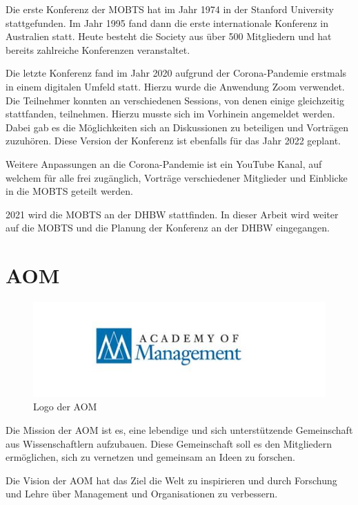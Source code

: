Die erste Konferenz der \ac{MOBTS} hat im Jahr 1974 in der Stanford University stattgefunden. Im Jahr 1995 fand dann die erste internationale Konferenz in Australien statt. \autocite[Vgl.][]{MOBTS.432021c} Heute besteht die Society aus über 500 Mitgliedern und hat bereits zahlreiche Konferenzen veranstaltet. \autocite[Vgl. Minute 13][]{MOBTS.432021b}

Die letzte Konferenz fand im Jahr 2020 aufgrund der Corona-Pandemie erstmals in einem digitalen Umfeld statt. Hierzu wurde die Anwendung Zoom verwendet. Die Teilnehmer konnten an verschiedenen Sessions, von denen einige gleichzeitig stattfanden, teilnehmen. Hierzu musste sich im Vorhinein angemeldet werden. \autocite[Vgl.][]{MOBTS.432021d}  Dabei gab es die Möglichkeiten sich an Diskussionen zu beteiligen und Vorträgen zuzuhören. Diese Version der Konferenz ist ebenfalls für das Jahr 2022 geplant. 

Weitere Anpassungen an die Corona-Pandemie ist ein YouTube Kanal, auf welchem für alle frei zugänglich, Vorträge verschiedener Mitglieder und Einblicke in die \ac{MOBTS} geteilt werden. \autocite[Vgl.][]{MOBTS.432021} 

2021 wird die \ac{MOBTS} an der DHBW stattfinden. In dieser Arbeit wird weiter auf die \ac{MOBTS} und die Planung der Konferenz an der DHBW eingegangen.

\section{\ac{AOM}}
\begin{figure}[h]
    \centering
    \includegraphics[width=1\textwidth]{img/th.jpg}
    \caption[Logo: AOM]{Logo der \ac{AOM}}
    \label{fig:LOGO AOM}
\end{figure}
Die Mission der \ac{AOM} ist es, eine lebendige und sich unterstützende Gemeinschaft aus Wissenschaftlern aufzubauen. Diese Gemeinschaft soll es den Mitgliedern ermöglichen, sich zu vernetzen und gemeinsam an Ideen zu forschen. \autocite[Vgl.][]{AOM_CMS.432021b} 

Die Vision der \ac{AOM} hat das Ziel die Welt zu inspirieren und durch Forschung  und Lehre über Management und Organisationen zu verbessern. \autocite[Vgl.][]{AOM_CMS.432021b}


